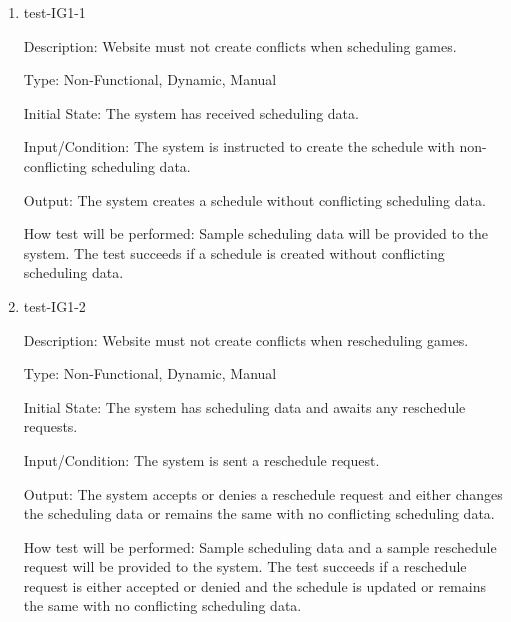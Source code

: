 \documentclass[12pt, titlepage]{article}
\begin{document}
\begin{enumerate}




  \item{test-IG1-1\\}
  
  Description: Website must not create conflicts when scheduling
  games.

  Type: Non-Functional, Dynamic, Manual

  Initial State: The system has received scheduling data.

  Input/Condition: The system is instructed to create the schedule with non-conflicting
  scheduling data.

  Output: The system creates a schedule without conflicting scheduling data.

  How test will be performed: Sample scheduling data will be provided to the system. The test
  succeeds if a schedule is created without conflicting scheduling data.

  \item{test-IG1-2\\}
  
  Description: Website must not create conflicts when rescheduling
  games.

  Type: Non-Functional, Dynamic, Manual

  Initial State: The system has scheduling data and awaits any reschedule requests.

  Input/Condition: The system is sent a reschedule request.

  Output: The system accepts or denies a reschedule request and either changes the scheduling
  data or remains the same with no conflicting scheduling data.

  How test will be performed: Sample scheduling data and a sample reschedule request
  will be provided to the system. The test succeeds if a reschedule request is either accepted
  or denied and the schedule is updated or remains the same with no conflicting scheduling
  data.


\end{enumerate}
\end{document}
